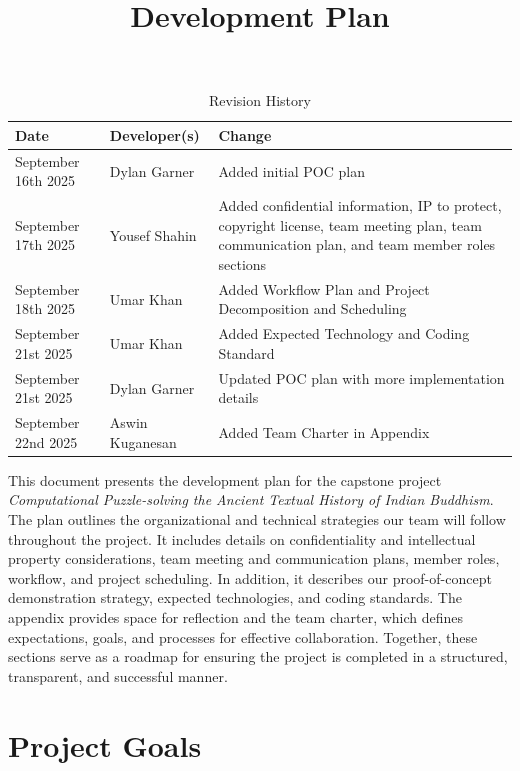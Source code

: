 \documentclass{article}
\title{Development Plan\\\progname}
\author{\authname}
\date{}
\begin{document}
\maketitle

\begin{table}[hp]
\caption{Revision History} \label{TblRevisionHistory}
\begin{tabularx}{\textwidth}{llX}
\toprule
\textbf{Date} & \textbf{Developer(s)} & \textbf{Change}\\
\midrule
September 16th 2025 & Dylan Garner & Added initial POC plan\\
September 17th 2025 & Yousef Shahin & Added confidential information, IP to protect, copyright license, team meeting plan, team communication plan, and team member roles sections\\
September 18th 2025 & Umar Khan & Added Workflow Plan and Project Decomposition and Scheduling\\
September 21st 2025 & Umar Khan & Added Expected Technology and Coding Standard \\
September 21st 2025 & Dylan Garner & Updated POC plan with more implementation details\\
September 22nd 2025 & Aswin Kuganesan & Added Team Charter in Appendix\\

\bottomrule
\end{tabularx}
\end{table}

\newpage{}

This document presents the development plan for the capstone project
\textit{Computational Puzzle-solving the Ancient Textual History of Indian Buddhism}.
The plan outlines the organizational and technical strategies our team will follow
throughout the project. It includes details on confidentiality and intellectual
property considerations, team meeting and communication plans, member roles, workflow,
and project scheduling. In addition, it describes our proof-of-concept demonstration
strategy, expected technologies, and coding standards. The appendix provides space
for reflection and the team charter, which defines expectations, goals, and processes
for effective collaboration. Together, these sections serve as a roadmap for ensuring
the project is completed in a structured, transparent, and successful manner.

\section{Project Goals}
\end{document}
